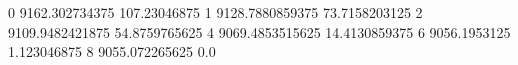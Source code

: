 0 9162.302734375 107.23046875
1 9128.7880859375 73.7158203125
2 9109.9482421875 54.8759765625
4 9069.4853515625 14.4130859375
6 9056.1953125 1.123046875
8 9055.072265625 0.0
